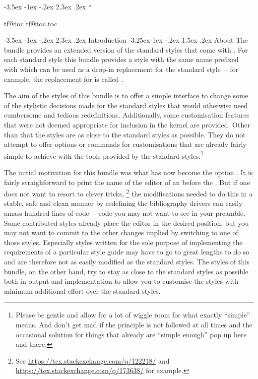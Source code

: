 \documentclass[11pt,a4paper]{article}
\makeatletter
\providecommand*{\printtitlepage}{}
\renewcommand\tableofcontents{%
    \pdfbookmark[1]{\contentsname}{contents}%
    \section*{\contentsname
        \@mkboth{%
           \MakeUppercase\contentsname}{\MakeUppercase\contentsname}}%
    \@starttoc{toc}%
    }
\def\@starttoc#1{%
  \begingroup
    \begin{multicols}{2}
    \makeatletter
    \RaggedRight
    \@input{\jobname.#1}%
    \if@filesw
      \expandafter\newwrite\csname tf@#1\endcsname
      \immediate\openout \csname tf@#1\endcsname \jobname.#1\relax
    \fi
    \end{multicols}
    \@nobreakfalse
  \endgroup}
\let\accentcolour\spotcolor
\newcommand*{\allsectionsfont}{\sffamily\accentcolour}
\renewcommand\section{\@startsection {section}{1}{\z@}%
                                     {-3.5ex \@plus -1ex \@minus -.2ex}%
                                     {2.3ex \@plus.2ex}%
                                     {\normalfont\Large\bfseries\allsectionsfont}}
\renewcommand\subsection{\@startsection{subsection}{2}{\z@}%
                                       {-3.25ex\@plus -1ex \@minus -.2ex}%
                                       {1.5ex \@plus .2ex}%
                                       {\normalfont\large\bfseries\allsectionsfont}}
\makeatother
\begin{document}
\printtitlepage
\tableofcontents

\section{Introduction}\label{sec:int}
\subsection{About}
The  bundle provides an extended version of the standard
styles that come with .
For each standard style this bundle provides a style with the same name
prefixed with  which can be used as a drop-in replacement for the
standard style~-- for example, the replacement for 
is called .

The aim of the styles of this bundle is to offer a simple interface to change
some of the stylistic decisions made for the standard styles that would
otherwise need cumbersome and tedious redefinitions.
Additionally, some customisation features that were not deemed appropriate
for inclusion in the  kernel are provided.
Other than that the styles are as close to the standard styles as possible.
They do not attempt to offer options or commands for customisations that
are already fairly simple to achieve with the tools provided by the standard
styles.\footnote{Please be gentle and allow for a lot of wiggle room for what
exactly \enquote{simple} means. And don't get mad if the principle is not
followed at all times and the occasional solution for things that already are
\enquote{simple enough} pop up here and there.}

The initial motivation for this bundle was what has now become the option
.
It is fairly straighforward to print the name of the editor of an
 before the .
But if one does not want to resort to clever tricks,%
\footnote{See \url{https://tex.stackexchange.com/q/122218/} and
\url{https://tex.stackexchange.com/q/173638/} for example.}
the modifications needed to do this in a stable, safe and clean manner by
redefining the bibliography drivers can easily amass hundred lines of code~--
code you may not want to see in your preamble.
Some contributed  styles already place the editor in the
desired position, but you may not want to commit to the other changes implied
by switching to one of those styles.
Especially styles written for the sole purpose of implementing the requirements
of a particular style guide may have to go to great lengths to do so and are
therefore not as easily modified as the standard styles.
The styles of this bundle, on the other hand, try to stay as close to the
standard styles as possible both in output and implementation to allow you
to customise the styles with minimum additional effort over the standard styles.
\end{document}
